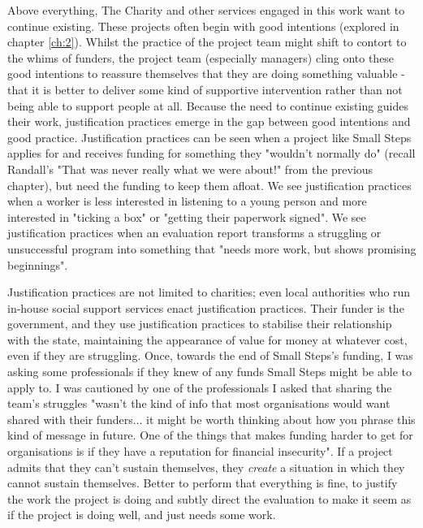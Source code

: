 Above everything, The Charity and other services engaged in this work want to continue existing. These projects often begin with good intentions (explored in chapter \ref{ch:2}). Whilst the practice of the project team might shift to contort to the whims of funders, the project team (especially managers) cling onto these good intentions to reassure themselves that they are doing something valuable - that it is better to deliver some kind of supportive intervention rather than not being able to support people at all. Because the need to continue existing guides their work, justification practices emerge in the gap between good intentions and good practice. Justification practices can be seen when a project like Small Steps applies for and receives funding for something they "wouldn't normally do" (recall Randall's "That was never really what we were about!" from the previous chapter), but need the funding to keep them afloat. We see justification practices when a worker is less interested in listening to a young person and more interested in "ticking a box" or "getting their paperwork signed". We see justification practices when an evaluation report transforms a struggling or unsuccessful program into something that "needs more work, but shows promising beginnings". 

Justification practices are not limited to charities; even local authorities who run in-house social support services enact justification practices. Their funder is the government, and they use justification practices to stabilise their relationship with the state, maintaining the appearance of value for money at whatever cost, even if they are struggling. Once, towards the end of Small Steps's funding, I was asking some professionals if they knew of any funds Small Steps might be able to apply to. I was cautioned by one of the professionals I asked that sharing the team's struggles "wasn't the kind of info that most organisations would want shared with their funders... it might be worth thinking about how you phrase this kind of message in future. One of the things that makes funding harder to get for organisations is if they have a reputation for financial insecurity". If a project admits that they can't sustain themselves, they \emph{create} a situation in which they cannot sustain themselves. Better to perform that everything is fine, to justify the work the project is doing and subtly direct the evaluation to make it seem as if the project is doing well, and just needs some work. 

